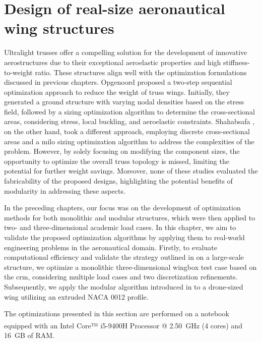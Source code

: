 \setchapterpreamble[u]{\margintoc}
\glsresetall %

\chapter{Design of real-size aeronautical wing structures} \label{chap:07}

Ultralight trusses offer a compelling solution for the development of innovative aerostructures due to their exceptional aeroelastic properties and high stiffness-to-weight ratio. These structures align well with the optimization formulations discussed in previous chapters. Opgenoord  proposed a two-step sequential optimization approach to reduce the weight of truss wings. Initially, they generated a ground structure with varying nodal densities based on the stress field, followed by a sizing optimization algorithm to determine the cross-sectional areas, considering stress, local buckling, and aeroelastic constraints. Shahabsafa , on the other hand, took a different approach, employing discrete cross-sectional areas and a \gls{milo} sizing optimization algorithm to address the complexities of the problem. However, by solely focusing on modifying the component sizes, the opportunity to optimize the overall truss topology is missed, limiting the potential for further weight savings. Moreover, none of these studies evaluated the fabricability of the proposed designs, highlighting the potential benefits of modularity in addressing these aspects.

In the preceding chapters, our focus was on the development of optimization methods for both monolithic and modular structures, which were then applied to two- and three-dimensional academic load cases. In this chapter, we aim to validate the proposed optimization algorithms by applying them to real-world engineering problems in the aeronautical domain. Firstly, to evaluate computational efficiency and validate the strategy outlined in  on a large-scale structure, we optimize a monolithic three-dimensional wingbox test case based on the \gls{crm}, considering multiple load cases and two discretization refinements. Subsequently, we apply the modular algorithm introduced in  to a drone-sized wing utilizing an extruded NACA 0012 profile.

The optimizations presented in this section are performed on a notebook equipped with an Intel\textsuperscript{\textregistered} Core™ i5-9400H Processor @ \qty{2.50}{GHz} (4 cores) and \qty{16}{GB} of RAM. 

